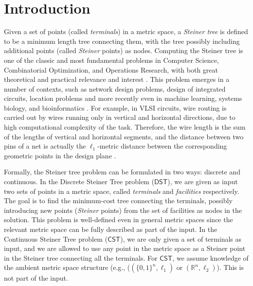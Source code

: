 \documentclass{theoretics}
\newcommand{\R}{\mathbb{R}}
\newcommand{\1}{\textbf{1}}
\newcommand{\cst}{$\mathsf{CST}$\xspace}
\newcommand{\dst}{$\mathsf{DST}$\xspace}
\newcommand{\apx}{$\mathsf{APX}$\xspace}
\begin{document}
\begin{abstract}
Due to the discrete structure of the Hamming space, the \apx-hardness of \cst in the $\ell_0$ and $\ell_1$ metrics follow from similar methods. However, these techniques do not extend to \cst in other $\ell_p$-metrics. To show \apx-hardness of \cst in the $\ell_{\infty}$-metric, we instead rely on the robust hardness guarantees of graph coloring problems. Concretely, we present a reduction from a graph $G$ on $n$ vertices to a point-set $P$  in the $\ell_\infty$-metric space, where the cost of the optimal Steiner tree of $P$ is exactly $\frac{n+\chi(G)}{2}$, where $\chi(G)$ is the chromatic number of $G$. 
\end{abstract}
 
 

\section{Introduction}


Given a set of points (called \emph{terminals}) in a metric space, a \emph{Steiner tree} is defined to be a minimum length tree connecting them, with the tree possibly including additional points (called \emph{Steiner} points) as nodes. Computing the Steiner
tree is one of the classic and most fundamental problems in Computer Science, Combinatorial Optimization, and Operations Research, with both great theoretical and practical relevance and interest \cite{ljubic2021solving}. 
This problem
emerges in a number of contexts, such as network design problems, design of integrated circuits, location problems \cite{cheng2013steiner,cho2001steiner,hwang1992steiner,lengauer2012combinatorial,resende2008handbook,noormohammadpour2017dccast}  and
more recently even in machine learning, systems biology, and bioinformatics \cite{backes2012integer,ideker2002discovering,russakovsky2010steiner, tuncbag2016network}.
For example, in VLSI circuits, wire routing is carried out by wires running only in vertical and horizontal directions, due to high computational complexity of the task. Therefore, the wire length is the sum of the lengths of vertical and horizontal segments, and the distance between two pins of a net is actually the $\ell_1$-metric  distance between the corresponding geometric points in the design plane \cite{sherwani2012algorithms}. 

Formally, the Steiner tree problem can be formulated in two ways: discrete and continuous. In the Discrete Steiner Tree problem (\dst), we are given as input two sets of points in a metric space, called \emph{terminals} and \emph{facilities} respectively. The goal is to find the minimum-cost tree connecting the terminals, possibly introducing new points (\emph{Steiner} points) from the set of facilities as nodes in the solution. This problem is well-defined even in general metric spaces since the relevant metric space can be fully described as part of the input. In the Continuous Steiner Tree problem (\cst), we are only given a set of terminals as input, and we are allowed to use any point in the metric space as a Steiner point in the Steiner tree connecting all the terminals. For \cst, we assume knowledge of the ambient metric space structure (e.g., ($(\{0,1\}^n, \ell_1)$ or $(\R^n, \ell_2)$). This is not part of the input.
\end{document}
